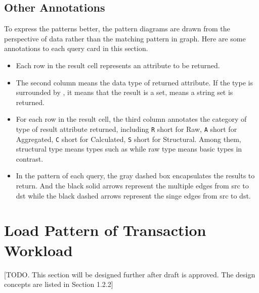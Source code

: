 
\subsection{Other Annotations}
\label{subsec:other-annotations}

To express the patterns better, the pattern diagrams are drawn from the perspective
of data rather than the matching pattern in graph. Here are some annotations to each
query card in this section.
\begin{itemize}
    \item Each row in the result cell represents an attribute to be returned.
    \item The second column means the data type of returned attribute.
          If the type is surrounded by \type{\{\}}, it means that the result is a
          set, \eg {} means a string set is returned.
    \item For each row in the result cell, the third column annotates the
          category of type of result attribute returned, including \texttt{R} short
          for Raw, \texttt{A} short for Aggregated, \texttt{C} short for Calculated,
          \texttt{S} short for Structural. Among them, structural type means types
          such as  while raw type means basic types in contrast.
   \item In the pattern of each query, the gray dashed box encapsulates the results
         to return. And the black solid arrows represent the multiple edges from src
         to dst while the black dashed arrows represent the singe edges from src to dst.
\end{itemize}


\section{Load Pattern of Transaction Workload}
 [TODO. This section will be designed further after draft is approved. The design concepts are listed in Section 1.2.2]

